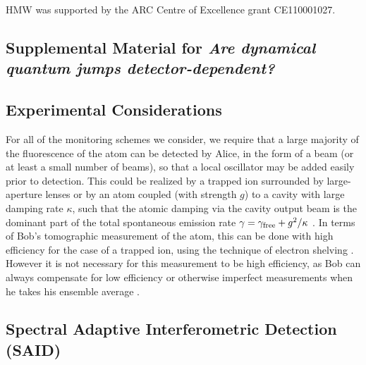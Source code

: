 \documentclass[12pt,prl,floatfix,showpacs,superscriptaddress,amsmath,amssymb]{revtex4}
\renewcommand{\(}{\left(}
\renewcommand{\)}{\right)}
\begin{document}
{HMW was supported by the ARC Centre of Excellence grant CE110001027. 

\begin{widetext}

\subsection{\large Supplemental Material for {\em Are dynamical quantum jumps  detector-dependent?}}


\subsection*{\large Experimental Considerations}

For all of the monitoring schemes we consider, we require that a large majority of the fluorescence of the atom 
can be detected by Alice, in the form of a beam (or at least a small number of beams), so that a local oscillator 
may be added easily prior to detection. This could be realized by a trapped ion surrounded by large-aperture lenses
or by an atom coupled (with strength $g$) to a cavity with large damping rate $\kappa$, such that the atomic damping via the cavity output beam is the dominant part of the total spontaneous emission rate $\gamma = \gamma_{\rm free} + g^2/\kappa$ \cite{MabDoh02}. In terms of Bob's tomographic measurement of the atom, this can be done with high efficiency 
for the case of a trapped ion, using the technique of electron shelving \cite{Ber86}. However it is not necessary 
for this measurement to be high efficiency, as Bob can always compensate for low efficiency or otherwise imperfect 
measurements when he takes his ensemble average \cite{Smi12}.


\subsection*{\large Spectral Adaptive Interferometric Detection (SAID)}


\end{widetext}}
\end{document}

